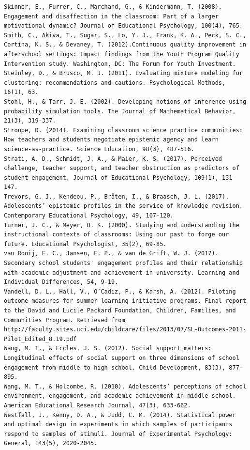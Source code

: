 \documentclass[]{book}
\theoremstyle{definition}
\theoremstyle{definition}
\theoremstyle{definition}
\theoremstyle{remark}
\begin{document}
\begin{verbatim}
Skinner, E., Furrer, C., Marchand, G., & Kindermann, T. (2008). Engagement and disaffection in the classroom: Part of a larger motivational dynamic? Journal of Educational Psychology, 100(4), 765.  
Smith, C., Akiva, T., Sugar, S., Lo, Y. J., Frank, K. A., Peck, S. C., Cortina, K. S., & Devaney, T. (2012).Continuous quality improvement in afterschool settings: Impact findings from the Youth Program Quality Intervention study. Washington, DC: The Forum for Youth Investment. 
Steinley, D., & Brusco, M. J. (2011). Evaluating mixture modeling for clustering: recommendations and cautions. Psychological Methods, 16(1), 63.  
Stohl, H., & Tarr, J. E. (2002). Developing notions of inference using probability simulation tools. The Journal of Mathematical Behavior, 21(3), 319-337.  
Stroupe, D. (2014). Examining classroom science practice communities: How teachers and students negotiate epistemic agency and learn science‐as‐practice. Science Education, 98(3), 487-516.  
Strati, A. D., Schmidt, J. A., & Maier, K. S. (2017). Perceived challenge, teacher support, and teacher obstruction as predictors of student engagement. Journal of Educational Psychology, 109(1), 131-147.  
Trevors, G. J., Kendeou, P., Bråten, I., & Braasch, J. L. (2017). Adolescents’ epistemic profiles in the service of knowledge revision. Contemporary Educational Psychology, 49, 107-120.  
Turner, J. C., & Meyer, D. K. (2000). Studying and understanding the instructional contexts of classrooms: Using our past to forge our future. Educational Psychologist, 35(2), 69-85.  
van Rooij, E. C., Jansen, E. P., & van de Grift, W. J. (2017). Secondary school students' engagement profiles and their relationship with academic adjustment and achievement in university. Learning and Individual Differences, 54, 9-19.  
Vandell, D. L., Hall, V., O’Cadiz, P., & Karsh, A. (2012). Piloting outcome measures for summer learning initiative programs. Final report to the David and Lucile Packard Foundation, Children, Families, and Communities Program. Retrieved from http://faculty.sites.uci.edu/childcare/files/2013/07/SL-Outcomes-2011-Pilot_Edited_8.19.pdf  
Wang, M. T., & Eccles, J. S. (2012). Social support matters: Longitudinal effects of social support on three dimensions of school engagement from middle to high school. Child Development, 83(3), 877-895.  
Wang, M. T., & Holcombe, R. (2010). Adolescents’ perceptions of school environment, engagement, and academic achievement in middle school. American Educational Research Journal, 47(3), 633-662.  
Westfall, J., Kenny, D. A., & Judd, C. M. (2014). Statistical power and optimal design in experiments in which samples of participants respond to samples of stimuli. Journal of Experimental Psychology: General, 143(5), 2020-2045.  

\end{verbatim}
\end{document}
